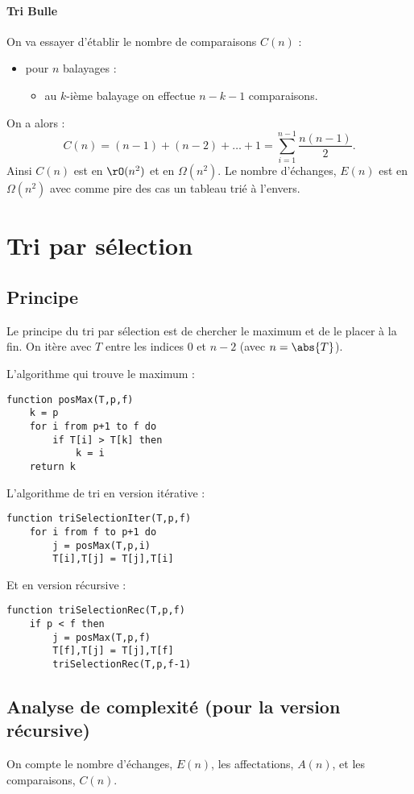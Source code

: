 \documentclass{mybourbaki}
\begin{document}
\paragraph{Tri Bulle}On va essayer d'établir le nombre de comparaisons $C(n)$ :
\begin{itemize}
\item pour $n$ balayages :
\begin{itemize}
\item au $k$-ième balayage on effectue $n-k-1$ comparaisons.
\end{itemize}
\end{itemize}
On a alors : \[ C(n) = (n-1) + (n-2) +\ldots + 1 = \sum_{i=1}^{n-1}\frac{n(n-1)}{2}.\] Ainsi $C(n)$ est en $\rO(n^{2})$ et en $\Omega(n^{2})$. Le nombre d'échanges, $E(n)$ est en $\Omega(n^{2})$ avec comme pire des cas un tableau trié à l'envers.

\section{Tri par sélection}
\subsection{Principe}Le principe du tri par sélection est de chercher le maximum et de le placer à la fin. On itère avec $T$ entre les indices $0$ et $n-2$ (avec $n = \abs{T}$).

L'algorithme qui trouve le maximum :
\begin{lstlisting}
function posMax(T,p,f)
	k = p
	for i from p+1 to f do
		if T[i] > T[k] then
			k = i
	return k		
\end{lstlisting}

L'algorithme de tri en version itérative :
\begin{lstlisting}
function triSelectionIter(T,p,f)
	for i from f to p+1 do
		j = posMax(T,p,i)
		T[i],T[j] = T[j],T[i]
\end{lstlisting}
Et en version récursive :
\begin{lstlisting}
function triSelectionRec(T,p,f)
	if p < f then
		j = posMax(T,p,f)
		T[f],T[j] = T[j],T[f]
		triSelectionRec(T,p,f-1)
\end{lstlisting}

\subsection{Analyse de complexité (pour la version récursive)}
On compte le nombre d'échanges, $E(n)$, les affectations, $A(n)$, et les comparaisons, $C(n)$.
\end{document}
